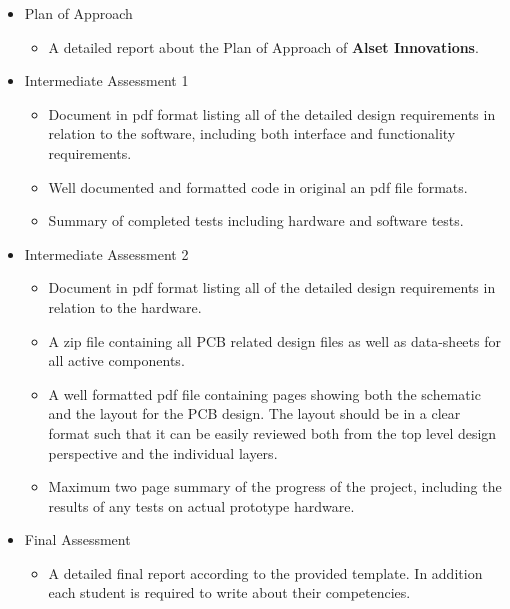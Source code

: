 \begin{itemize}
    \item Plan of Approach
        \begin{itemize}
            \item A detailed report about the Plan of Approach of \textbf{Alset Innovations}.
        \end{itemize}
    \item Intermediate Assessment 1
        \begin{itemize}
            \item Document in pdf format listing all of the detailed design requirements
            in relation to the software, including both interface and functionality
            requirements.
            \item Well documented and formatted code in original an pdf file formats.
            \item Summary of completed tests including hardware and software tests.
        \end{itemize}
    \item Intermediate Assessment 2
        \begin{itemize}
            \item Document in pdf format listing all of the detailed design requirements
            in relation to the hardware.
            \item A zip file containing all PCB related design files as well as data-sheets for all active components.
            \item A well formatted pdf file containing pages showing both the schematic
            and the layout for the PCB design. The layout should be in a clear
            format such that it can be easily reviewed both from the top level
            design perspective and the individual layers.
            \item Maximum two page summary of the progress of the project, including
            the results of any tests on actual prototype hardware.
        \end{itemize}
    \item Final Assessment
        \begin{itemize}
            \item A detailed final report according to the provided template. In addition each student is required to write about their competencies.
        \end{itemize}
\end{itemize}